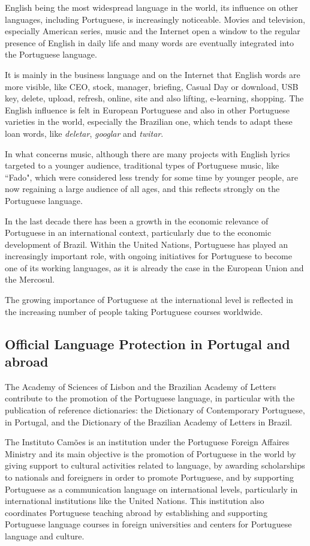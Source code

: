 \begin{multicols}{2}
   English being the most widespread language in the world, its influence on other languages, including Portuguese, is increasingly noticeable. Movies and television, especially American series, music and the Internet open a window to the regular presence of English in daily life and many words are eventually integrated into the Portuguese language.

It is mainly in the business language and on the Internet that English words are more visible, like CEO, stock, manager, briefing, Casual Day or download, USB key, delete, upload, refresh, online, site and also lifting, e-learning, shopping. The English influence is felt in European Portuguese and also in other Portuguese varieties in the world, especially the Brazilian one, which tends to adapt these loan words, like \textit{deletar}, \textit{googlar} and \textit{twitar}.

In what concerns music, although there are many projects with English lyrics targeted to a younger audience, traditional types of Portuguese music, like “Fado", which were considered less trendy for some time by younger people, are now regaining a large audience of all ages, and this reflects strongly on the Portuguese language.

  In the last decade there has been a growth in the economic relevance of Portuguese in an international context, particularly due to the economic development of Brazil. Within the United Nations, Portuguese has played an increasingly important role, with ongoing initiatives for Portuguese to become one of its working languages, as it is already the case in the European Union and the Mercosul.

The growing importance of Portuguese at the international level is reflected in the increasing number of people taking Portuguese courses worldwide.

\subsection{Official Language Protection in Portugal and abroad}

The Academy of Sciences of Lisbon and the Brazilian Academy of Letters contribute to the promotion of the Portuguese language, in particular with the publication of reference dictionaries: the Dictionary of Contemporary Portuguese, in Portugal, and the Dictionary of the Brazilian Academy of Letters in Brazil. 

The Instituto Camões is an institution under the Portuguese Foreign Affaires Ministry and its main objective is the promotion of Portuguese in the world by giving support to cultural activities related to language, by awarding scholarships to nationals and foreigners in order to promote Portuguese, and by supporting Portuguese as a communication language on international levels, particularly in international institutions like the United Nations. This institution also coordinates Portuguese teaching abroad by establishing and supporting Portuguese language courses in foreign universities and centers for Portuguese language and culture.


\end{multicols}
